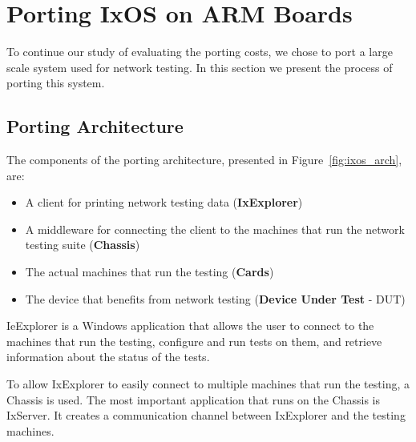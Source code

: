 \chapter{Porting IxOS on ARM Boards} \label{sec:portingIxos}

To continue our study of evaluating the porting costs, we chose to port a large
scale system used for network testing. In this section we present the
process of porting this system. 

\section{Porting Architecture}

The components of the porting architecture, presented in
Figure~\ref{fig:ixos_arch}, are:
\begin{itemize}
    \item A client for printing network testing data (\textbf{IxExplorer})
    \item A middleware for connecting the client to the machines that run the
    network testing suite (\textbf{Chassis})
    \item The actual machines that run the testing (\textbf{Cards})
    \item The device that benefits from network testing (\textbf{Device Under Test} - DUT)
\end{itemize}

IeExplorer is a Windows application that allows the user to connect to the
machines that run the testing, configure and run tests on them, and retrieve
information about the status of the tests.

To allow IxExplorer to easily connect to multiple machines that run the testing,
a Chassis is used. The most important application that runs on the Chassis is
IxServer. It creates a communication channel between IxExplorer and the testing
machines.


